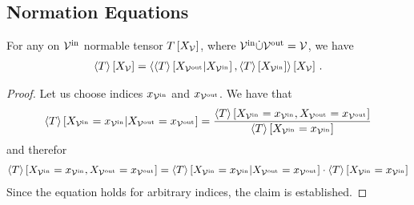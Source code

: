 \subsection{Normation Equations}

\begin{theorem}\label{the:normationContractionEQ}
	For any on $\mathcal{V}^{\mathrm{in}}$ normable tensor $T\left[X_{\mathcal{V}}\right]$, where $\mathcal{V}^{\mathrm{in}}\dot{\cup}\mathcal{V}^{\mathrm{out}}=\mathcal{V}$, we have
	\begin{align*}
		\left\langle T\right\rangle \left[ X_{\mathcal{V}} \right] 
		= \left\langle \left\langle T\right\rangle \left[ X_{\mathcal{V}^{\mathrm{out}}} | X_{\mathcal{V}^{\mathrm{in}}} \right],\left\langle T\right\rangle \left[ X_{\mathcal{V}^{\mathrm{in}}} \right]\right\rangle \left[ X_{\mathcal{V}} \right] \, . 
	\end{align*}
\end{theorem}
\begin{proof}
	Let us choose indices $x_{\mathcal{V}^{\mathrm{in}}}$ and $x_{\mathcal{V}^{\mathrm{out}}}$.
	We have that
	\begin{align*}
		\left\langle T\right\rangle \left[ X_{\mathcal{V}^{\mathrm{in}}}=x_{\mathcal{V}^{\mathrm{in}}} | X_{\mathcal{V}^{\mathrm{out}}}=x_{\mathcal{V}^{\mathrm{out}}} \right]
		= \frac{
			\left\langle T\right\rangle \left[ X_{\mathcal{V}^{\mathrm{in}}}=x_{\mathcal{V}^{\mathrm{in}}},X_{\mathcal{V}^{\mathrm{out}}}=x_{\mathcal{V}^{\mathrm{out}}} \right] 	
		}{
			\left\langle T\right\rangle \left[ X_{\mathcal{V}^{\mathrm{in}}}=x_{\mathcal{V}^{\mathrm{in}}} \right] 	
		} 
	\end{align*}
	and therefor
	\begin{align*}
		\left\langle T\right\rangle \left[ X_{\mathcal{V}^{\mathrm{in}}}=x_{\mathcal{V}^{\mathrm{in}}},X_{\mathcal{V}^{\mathrm{out}}}=x_{\mathcal{V}^{\mathrm{out}}} \right] = 
		\left\langle T\right\rangle \left[ X_{\mathcal{V}^{\mathrm{in}}}=x_{\mathcal{V}^{\mathrm{in}}} | X_{\mathcal{V}^{\mathrm{out}}}=x_{\mathcal{V}^{\mathrm{out}}} \right]
		\cdot 
		\left\langle T\right\rangle \left[ X_{\mathcal{V}^{\mathrm{in}}}=x_{\mathcal{V}^{\mathrm{in}}} \right] 	
	\end{align*}
	Since the equation holds for arbitrary indices, the claim is established.
\end{proof}


